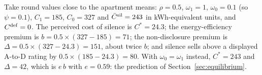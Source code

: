 Take round values close to the apartment means: $\rho=0.5$, $\omega_1=1$, $\omega_0=0.1$ (so $\psi=0.1$), $C_1=185$, $C_0=327$ and $\bar C^{\rm sil}=243$ in kWh-equivalent units, and $C^{\rm def}=0$. The perceived cost of silence is $C^*=24.3$; the energy-efficiency premium is $b=0.5\times(327-185)=71$; the non-disclosure premium is $\Delta=0.5\times(327-24.3)=151$, about twice $b$; and silence sells above a displayed A-to-D rating by $0.5\times(185-24.3)=80$. With $\omega_0=\omega_1$ instead, $C^*=243$ and $\Delta=42$, which is $e\,b$ with $e=0.59$: the prediction of Section~\ref{sec:equilibrium}.
